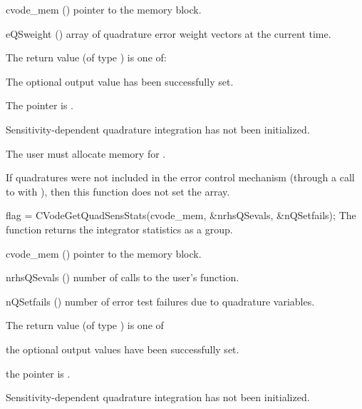 {
  \begin{args}[eQSweight]
  \item[cvode\_mem] ()
    pointer to the {\cvodes} memory block.
  \item[eQSweight] ()
    array of quadrature error weight vectors at the current time.
  \end{args}
}
{
  The return value  (of type ) is one of:
  \begin{args}
  \item[\Id{CV\_SUCCESS}] 
    The optional output value has been successfully set.
  \item[\Id{CVODE\_MEM\_NULL}]
    The  pointer is .
  \item[\Id{CV\_NO\_QUADSENS}]
    Sensitivity-dependent quadrature integration has not been initialized.
  \end{args}
}
{
  {\warn}The user must allocate memory for .

  If quadratures were not included in the error control mechanism (through a 
  call to  with ), then
  this function does not set the  array.
}
{
  flag = CVodeGetQuadSensStats(cvode\_mem, \&nrhsQSevals, \&nQSetfails);
}
{
  The function  returns the {\cvodes} integrator statistics
  as a group.
}
{
  \begin{args}[nrhsQSevals]
  \item[cvode\_mem] ()
    pointer to the {\cvodes} memory block.
  \item[nrhsQSevals] ()
    number of calls to the user's  function.
  \item[nQSetfails] ()
    number of error test failures due to quadrature variables.
  \end{args}
}
{
  The return value  (of type ) is one of
  \begin{args}[CV\_NO\_QUADSENS]
  \item[\Id{CV\_SUCCESS}] 
    the optional output values have been successfully set.
  \item[\Id{CVODE\_MEM\_NULL}]
    the  pointer is .
  \item[\Id{CV\_NO\_QUADSENS}]
    Sensitivity-dependent quadrature integration has not been initialized.
  \end{args}
}
{}

